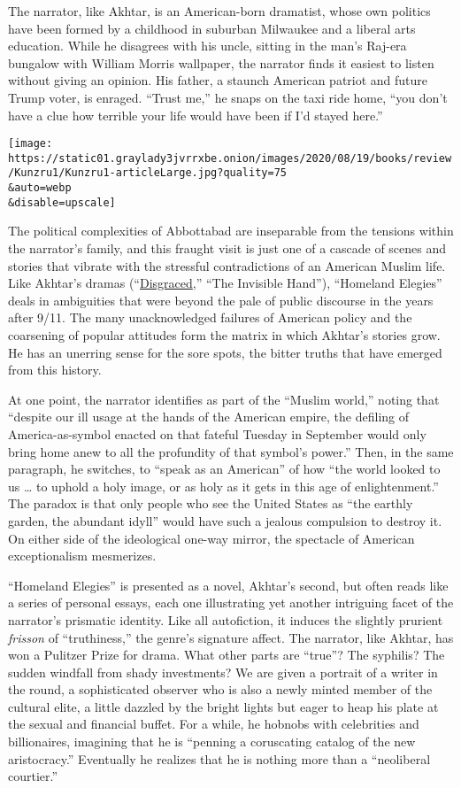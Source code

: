 The narrator, like Akhtar, is an American-born dramatist, whose own
politics have been formed by a childhood in suburban Milwaukee and a
liberal arts education. While he disagrees with his uncle, sitting in
the man's Raj-era bungalow with William Morris wallpaper, the narrator
finds it easiest to listen without giving an opinion. His father, a
staunch American patriot and future Trump voter, is enraged. ``Trust
me,'' he snaps on the taxi ride home, ``you don't have a clue how
terrible your life would have been if I'd stayed here.''

\texttt{[image: https://static01.graylady3jvrrxbe.onion/images/2020/08/19/books/review/Kunzru1/Kunzru1-articleLarge.jpg?quality=75\\\&auto=webp\\\&disable=upscale]}

The political complexities of Abbottabad are inseparable from the
tensions within the narrator's family, and this fraught visit is just
one of a cascade of scenes and stories that vibrate with the stressful
contradictions of an American Muslim life. Like Akhtar's dramas
(``\href{https://www.nytimes3xbfgragh.onion/2012/10/23/theater/reviews/disgraced-by-ayad-akhtar-with-aasif-mandvi.html}{Disgraced},''
``The Invisible Hand''), ``Homeland Elegies'' deals in ambiguities that
were beyond the pale of public discourse in the years after 9/11. The
many unacknowledged failures of American policy and the coarsening of
popular attitudes form the matrix in which Akhtar's stories grow. He has
an unerring sense for the sore spots, the bitter truths that have
emerged from this history.

At one point, the narrator identifies as part of the ``Muslim world,''
noting that ``despite our ill usage at the hands of the American empire,
the defiling of America-as-symbol enacted on that fateful Tuesday in
September would only bring home anew to all the profundity of that
symbol's power.'' Then, in the same paragraph, he switches, to ``speak
as an American'' of how ``the world looked to us \ldots{} to uphold a
holy image, or as holy as it gets in this age of enlightenment.'' The
paradox is that only people who see the United States as ``the earthly
garden, the abundant idyll'' would have such a jealous compulsion to
destroy it. On either side of the ideological one-way mirror, the
spectacle of American exceptionalism mesmerizes.

``Homeland Elegies'' is presented as a novel, Akhtar's second, but often
reads like a series of personal essays, each one illustrating yet
another intriguing facet of the narrator's prismatic identity. Like all
autofiction, it induces the slightly prurient \emph{frisson} of
``truthiness,'' the genre's signature affect. The narrator, like Akhtar,
has won a Pulitzer Prize for drama. What other parts are ``true''? The
syphilis? The sudden windfall from shady investments? We are given a
portrait of a writer in the round, a sophisticated observer who is also
a newly minted member of the cultural elite, a little dazzled by the
bright lights but eager to heap his plate at the sexual and financial
buffet. For a while, he hobnobs with celebrities and billionaires,
imagining that he is ``penning a coruscating catalog of the new
aristocracy.'' Eventually he realizes that he is nothing more than a
``neoliberal courtier.''

